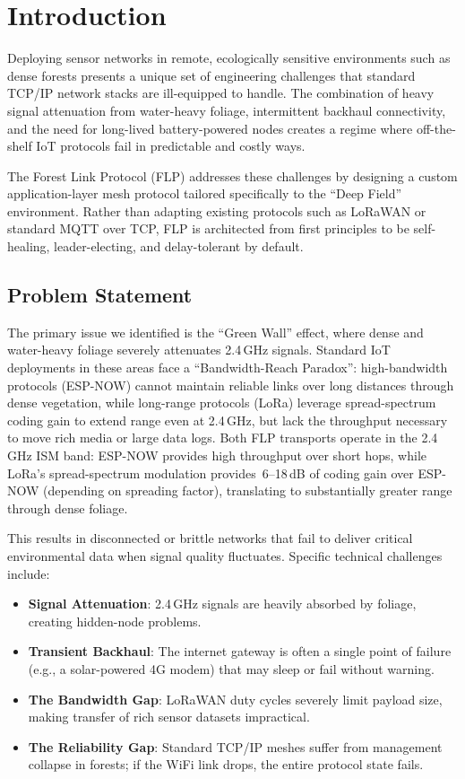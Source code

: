 \documentclass[conference]{IEEEtran}
\begin{document}
\section{Introduction}
\label{sec:introduction}

Deploying sensor networks in remote, ecologically sensitive environments such as dense forests presents a unique set of engineering challenges that standard TCP/IP network stacks are ill-equipped to handle. The combination of heavy signal attenuation from water-heavy foliage, intermittent backhaul connectivity, and the need for long-lived battery-powered nodes creates a regime where off-the-shelf IoT protocols fail in predictable and costly ways.

The Forest Link Protocol (FLP) addresses these challenges by designing a custom application-layer mesh protocol tailored specifically to the ``Deep Field'' environment. Rather than adapting existing protocols such as LoRaWAN or standard MQTT over TCP, FLP is architected from first principles to be self-healing, leader-electing, and delay-tolerant by default.

\subsection{Problem Statement}

The primary issue we identified is the ``Green Wall'' effect, where dense and water-heavy foliage severely attenuates 2.4\,GHz signals. Standard IoT deployments in these areas face a ``Bandwidth-Reach Paradox'': high-bandwidth protocols (ESP-NOW) cannot maintain reliable links over long distances through dense vegetation, while long-range protocols (LoRa) leverage spread-spectrum coding gain to extend range even at 2.4\,GHz, but lack the throughput necessary to move rich media or large data logs. Both FLP transports operate in the 2.4\,GHz ISM band: ESP-NOW provides high throughput over short hops, while LoRa's spread-spectrum modulation provides~6--18\,dB of coding gain over ESP-NOW (depending on spreading factor), translating to substantially greater range through dense foliage.

This results in disconnected or brittle networks that fail to deliver critical environmental data when signal quality fluctuates. Specific technical challenges include:

\begin{itemize}
  \item \textbf{Signal Attenuation}: 2.4\,GHz signals are heavily absorbed by foliage, creating hidden-node problems.
  \item \textbf{Transient Backhaul}: The internet gateway is often a single point of failure (e.g., a solar-powered 4G modem) that may sleep or fail without warning.
  \item \textbf{The Bandwidth Gap}: LoRaWAN duty cycles severely limit payload size, making transfer of rich sensor datasets impractical.
  \item \textbf{The Reliability Gap}: Standard TCP/IP meshes suffer from management collapse in forests; if the WiFi link drops, the entire protocol state fails.
\end{itemize}
\end{document}
